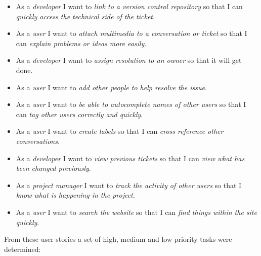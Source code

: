 \documentclass[a4paper]{l3proj}
\begin{document}
\begin{itemize}
\item As a \textit{developer} I want to \textit{link to a version control repository} so that I can \textit{quickly access the technical side of the ticket}.
\item As a \textit{user} I want to \textit{attach multimedia to a conversation or ticket} so that I can \textit{explain problems or ideas more easily}.
\item As a \textit{developer} I want to \textit{assign resolution to an owner} so that it will get done.
\item As a \textit{user} I want to \textit{add other people to help resolve the issue}.
\item As a \textit{user} I want to \textit{be able to autocomplete names of other users} so that I can \textit{tag other users correctly and quickly}.
\item As a \textit{user} I want to \textit{create labels} so that I can \textit{cross reference other conversations}.
\item As a \textit{developer} I want to \textit{view previous tickets} so that I can \textit{view what has been changed previously}.
\item As a \textit{project manager} I want to \textit{track the activity of other users} so that I \textit{know what is happening in the project}.
\item As a \textit{user} I want to \textit{search the website} so that I can \textit{find things within the site quickly}.
\end{itemize}

From these user stories a set of high, medium and low priority tasks were determined:
\end{document}
